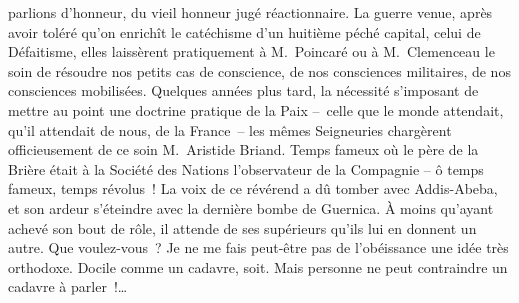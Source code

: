 \documentclass[french,twoside]{book} %
\newcommand{\astertri}{\medskip\par\centerline{\color{rubric}\large\selectfont{\syms ✻\,✻\,✻}}\medskip\par}%
\begin{document}
parlions d’honneur, du vieil honneur jugé réactionnaire. La guerre venue, après avoir toléré qu’on enrichît le catéchisme d’un huitième péché capital, celui de Défaitisme, elles laissèrent pratiquement à M. Poincaré ou à M. Clemenceau le soin de résoudre nos petits cas de conscience, de nos consciences militaires, de nos consciences mobilisées. Quelques années plus tard, la nécessité s’imposant de mettre au point une doctrine pratique de la Paix – celle que le monde attendait, qu’il attendait de nous, de la France – les mêmes Seigneuries chargèrent officieusement de ce soin M. Aristide Briand. Temps fameux où le père de la Brière était à la Société des Nations l’observateur de la Compagnie – ô temps fameux, temps révolus ! La voix de ce révérend a dû tomber avec Addis-Abeba, et son ardeur s’éteindre avec la dernière bombe de Guernica. À moins qu’ayant achevé son bout de rôle, il attende de ses supérieurs qu’ils lui en donnent un autre. Que voulez-vous ? Je ne me fais peut-être pas de l’obéissance une idée très orthodoxe. Docile comme un cadavre, soit. Mais personne ne peut contraindre un cadavre à parler !…\par
 \par

\astertri
\end{document}
